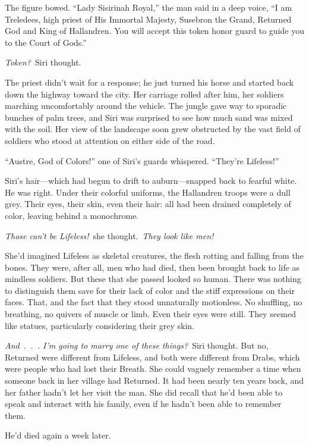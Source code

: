 The figure bowed. “Lady Sisirinah Royal,” the man said in a deep voice, “I am Treledees, high priest of His Immortal Majesty, Susebron the Grand, Returned God and King of Hallandren. You will accept this token honor guard to guide you to the Court of Gods.”

\textit{Token?}~Siri thought.

The priest didn’t wait for a response; he just turned his horse and started back down the highway toward the city. Her carriage rolled after him, her soldiers marching uncomfortably around the vehicle. The jungle gave way to sporadic bunches of palm trees, and Siri was surprised to see how much sand was mixed with the soil. Her view of the landscape soon grew obstructed by the vast field of soldiers who stood at attention on either side of the road.

“Austre, God of Colors!” one of Siri’s guards whispered. “They’re Lifeless!”

Siri’s hair—which had begun to drift to auburn—snapped back to fearful white. He was right. Under their colorful uniforms, the Hallandren troops were a dull grey. Their eyes, their skin, even their hair: all had been drained completely of color, leaving behind a monochrome.

\textit{Those can’t be Lifeless!}~she thought.~\textit{They look like men!}

She’d imagined Lifeless as skeletal creatures, the flesh rotting and falling from the bones. They were, after all, men who had died, then been brought back to life as mindless soldiers. But these that she passed looked so human. There was nothing to distinguish them save for their lack of color and the stiff expressions on their faces. That, and the fact that they stood unnaturally motionless. No shuffling, no breathing, no quivers of muscle or limb. Even their eyes were still. They seemed like statues, particularly considering their grey skin.

\textit{And~.~.~. I’m going to marry one of these things?}~Siri thought. But no, Returned were different from Lifeless, and both were different from Drabs, which were people who had lost their Breath. She could vaguely remember a time when someone back in her village had Returned. It had been nearly ten years back, and her father hadn’t let her visit the man. She did recall that he’d been able to speak and interact with his family, even if he hadn’t been able to remember them.

He’d died again a week later.

